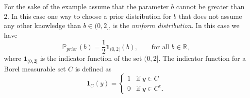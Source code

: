 \documentclass{sfuthesis}
\newcommand{\prior}{\mathbb{P}_{prior}}
\begin{document}
For the sake of
the example  assume  that
the parameter $b$ cannot be greater than $2$. In this case one way to choose a prior distribution
for $b$ that does not assume any other knowledge than $b\in (0,2]$, is the \textit{uniform distribution}. 
In this case we have 
\begin{equation}\label{eqnpriortoyproblem}
\prior(b)=\frac{1}{2}\textbf{1}_{(0,2]}(b),\qquad\text{for all $b\in\mathbb{R}$},
\end{equation}
where $\textbf{1}_{(0,2]}$ is the indicator function of the set $(0,2]$. The indicator function for a Borel measurable set $C$ is
defined as
\begin{equation*}
\textbf{1}_{C}(y)=\left\{
	\begin{array}{ll}
		1 & \mbox{if }	y\in C\\
		0 & \mbox{if }   y\in C^{c}.
	\end{array}
\right.
\end{equation*}
\end{document}
